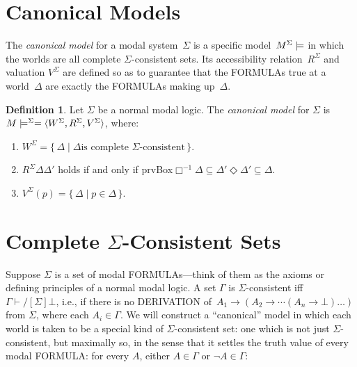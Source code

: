 \documentclass[10pt,a4paper]{article}
\newcommand*{\olup}[1]{\MakeUppercase{#1}}
\theoremstyle{plain}
\theoremstyle{definition}
\newtheorem{defn}[thm]{Definition}
\theoremstyle{remark}
\newcommand*{\olfileid}[3]{}
\newcommand*{\olsection}[1]{\section*{#1}}
\providecommand{\lif}{\mathbin{\rightarrow}}
\providecommand{\lfalse}{\bot}
\providecommand{\Proves}{\mathrel{\vdash}}
\providecommand{\mModel}[2]{\ensuremath{#1 \models #2}}
\providecommand{\tuple}[1]{\langle #1 \rangle}
\providecommand{\iftag}[1]{#1}
\providecommand{\Setabs}[2]{\{\, #1 \mid #2 \,\}}
\providecommand{\iftag}{}
\begin{document}



\olfileid{nml}{com}{cmd}

\olsection{Canonical Models}

The \emph{canonical model} for a modal system~$\Sigma$ is a specific
model~$\mModel{M^\Sigma}$ in which the worlds are all complete
$\Sigma$-consistent sets. Its accessibility relation~$R^\Sigma$ and
valuation $V^\Sigma$ are defined so as to guarantee that the
\olup{formula}s true at a world~$\Delta$ are exactly the \olup{formula}s
making up~$\Delta$.

\begin{defn}
  Let $\Sigma$ be a normal modal logic. The \emph{canonical model} for
  $\Sigma$ is $\mModel{M}^\Sigma = \tuple{W^\Sigma, R^\Sigma,
    V^\Sigma}$, where:
  \begin{enumerate}
  \item $W^\Sigma = \Setabs{ \Delta }{\Delta \text{
      is complete $\Sigma$-consistent} }$.
  \item $R^\Sigma \Delta\Delta'$ holds if and only if
    \iftag{prvBox}{$\Box^{-1}\Delta \subseteq
      \Delta'$}{$\Diamond\Delta' \subseteq \Delta$}.
  \item $V^\Sigma(p) = \Setabs{\Delta}{p \in \Delta}$.
  \end{enumerate}
\end{defn}






\olfileid{nml}{com}{ccs}

\olsection{Complete $\Sigma$-Consistent Sets}

Suppose $\Sigma$ is a set of modal \olup{formula}s---think of them as the
axioms or defining principles of a normal modal logic. A set $\Gamma$
is $\Sigma$-consistent iff $\Gamma \Proves/[\Sigma] \lfalse$, i.e., if
there is no \olup{derivation} of~$A_1 \lif (A_2 \lif \cdots (A_n \lif
\lfalse)\dots)$ from $\Sigma$, where each $A_i \in \Gamma$. We will
construct a ``canonical'' model in which each world is taken to be a
special kind of $\Sigma$-consistent set: one which is not just
$\Sigma$-consistent, but maximally so, in the sense that it settles
the truth value of every modal \olup{formula}: for every $A$, either $A
\in \Gamma$ or $\lnot A \in \Gamma$:
\end{document}

